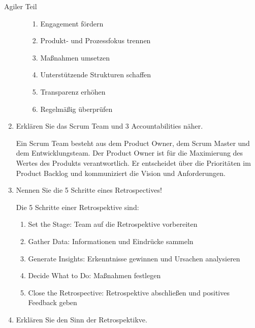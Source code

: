 \documentclass{article}
\begin{document}
\begin{exercise}{Agiler Teil}
\begin{enumerate}
\begin{solution}
\begin{enumerate}
\begin{enumerate}
                      \item Engagement fördern
                      \item Produkt- und Prozessfokus trennen
                      \item Maßnahmen umsetzen
                      \item Unterstützende Strukturen schaffen
                      \item Transparenz erhöhen
                      \item Regelmäßig überprüfen
                    \end{enumerate}
            \end{enumerate}
          \end{solution}

    \item Erklären Sie das Scrum Team und 3 Accountabilities näher.

          \begin{solution}
            Ein Scrum Team besteht aus dem Product Owner, dem Scrum Master und dem Entwicklungsteam. Der Product Owner ist für die Maximierung des Wertes des Produkts verantwortlich. Er entscheidet über die Prioritäten im Product Backlog und kommuniziert die Vision und Anforderungen.
          \end{solution}

    \item Nennen Sie die 5 Schritte eines Retrospectives!

          \begin{solution}
            Die 5 Schritte einer Retrospektive sind:
            \begin{enumerate}
              \item Set the Stage: Team auf die Retrospektive vorbereiten
              \item Gather Data: Informationen und Eindrücke sammeln
              \item Generate Insights: Erkenntnisse gewinnen und Ursachen analysieren
              \item Decide What to Do: Maßnahmen festlegen
              \item Close the Retrospective: Retrospektive abschließen und positives Feedback geben
            \end{enumerate}
          \end{solution}

    \item Erklären Sie den Sinn der Retrospektikve.


\end{enumerate}
\end{exercise}
\end{document}
